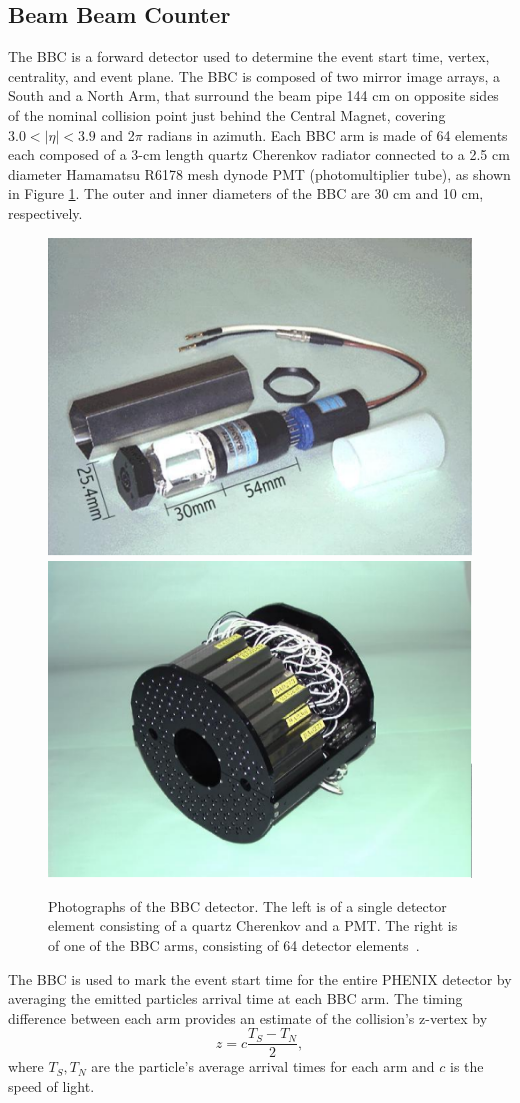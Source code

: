 \subsection{Beam Beam Counter}
The BBC is a forward detector used to determine the event start time, vertex, centrality, and event plane. The BBC is composed of two mirror image arrays, a South and a North Arm, that surround the beam pipe 144 cm on opposite sides of the nominal collision point just behind the Central Magnet, covering $3.0 < |\eta| < 3.9$ and 2$\pi$ radians in azimuth. Each BBC arm is made of 64 elements each composed of a 3-cm length quartz Cherenkov radiator connected to a 2.5 cm diameter Hamamatsu R6178 mesh dynode PMT (photomultiplier tube), as shown in Figure \ref{fig:bbc_dector}. The outer and inner diameters of the BBC are 30 cm and 10 cm, respectively.%
\begin{figure}[!ht]
\begin{center}
\includegraphics[width=0.45\linewidth]{figs/bbc_pmt.png}
\includegraphics[width=0.45\linewidth]{figs/bbc_arm.png}
\caption{Photographs of the BBC detector. The left is of a single detector element consisting of a quartz Cherenkov and a PMT. The right is of one of the BBC arms, consisting of 64 detector elements~\cite{Adcox2003469}.}
\label{fig:bbc_dector}
\end{center}
\end{figure}

The BBC is used to mark the event start time for the entire PHENIX detector by averaging the emitted particles arrival time at each BBC arm. The timing difference between each arm provides an estimate of the collision's z-vertex by
\begin{equation}
z = c \frac{T_S - T_N}{2},
\end{equation}
where $T_S, T_N$ are the particle's average arrival times for each arm and $c$ is the speed of light.%

